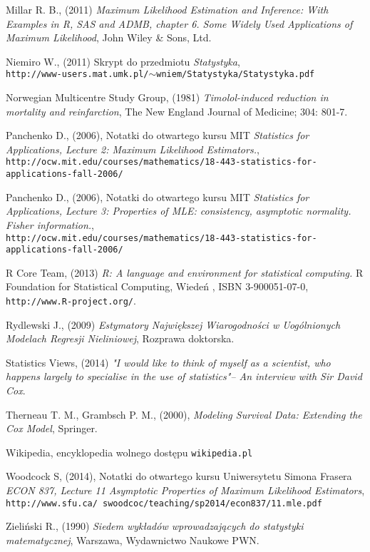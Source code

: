 \begin{thebibliography}{99}
 Millar R. B., (2011) \textit{Maximum Likelihood Estimation and Inference: With Examples in R, SAS and ADMB, chapter 6. Some Widely Used Applications of Maximum Likelihood}, John Wiley \& Sons, Ltd.

 Niemiro W., (2011) Skrypt do przedmiotu \textit{Statystyka}, \\ \texttt{http://www-users.mat.umk.pl/$\sim$wniem/Statystyka/Statystyka.pdf}

 Norwegian Multicentre Study Group, (1981) \textit{Timolol-induced reduction in
mortality and reinfarction}, The New England  Journal of Medicine; 304: 801-7.


 Panchenko D., (2006), Notatki do otwartego kursu MIT \textit{Statistics for Applications, Lecture 2: Maximum Likelihood Estimators.}, \\
\texttt{http://ocw.mit.edu/courses/mathematics/18-443-statistics-for-applications-fall-2006/}



 Panchenko D., (2006), Notatki do otwartego kursu MIT \textit{Statistics for Applications, Lecture 3: Properties of MLE: consistency, asymptotic normality. Fisher information.}, \\
\texttt{http://ocw.mit.edu/courses/mathematics/18-443-statistics-for-applications-fall-2006/}



 R Core Team, (2013) \textit{R: A language and environment for statistical computing.} R Foundation for Statistical Computing, Wiedeń , ISBN 3-900051-07-0, \texttt{http://www.R-project.org/}.

 Rydlewski J., (2009) \textit{Estymatory Największej Wiarogodności w Uogólnionych Modelach Regresji Nieliniowej}, Rozprawa doktorska.

 Statistics Views, (2014) \textit{ "I would like to think of myself as a scientist, who happens largely to specialise in the use of statistics"– An interview with Sir David Cox}. 

 Therneau T. M., Grambsch P. M., (2000), \textit{Modeling Survival Data: Extending the Cox Model}, Springer.

 Wikipedia, encyklopedia wolnego dostępu \texttt{wikipedia.pl}
 
  Woodcock S, (2014), Notatki do otwartego kursu Uniwersytetu Simona Frasera \textit{ECON 837, Lecture 11 Asymptotic Properties of Maximum Likelihood Estimators}, \\ \texttt{http://www.sfu.ca/~swoodcoc/teaching/sp2014/econ837/11.mle.pdf}
 
 Zieliński R., (1990) \textit{Siedem wykładów wprowadzających do statystyki matematycznej}, Warszawa, Wydawnictwo Naukowe PWN.


\end{thebibliography}